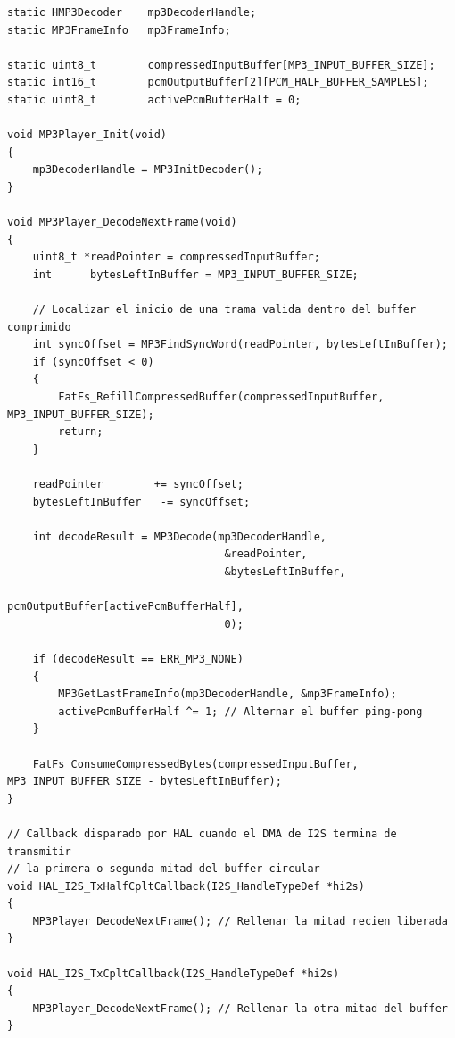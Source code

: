 \documentclass[pdflatex,sn-mathphys-num]{sn-jnl}%
\begin{document}
\begin{lstlisting}[style=algorithmstyle]
static HMP3Decoder    mp3DecoderHandle;
static MP3FrameInfo   mp3FrameInfo;

static uint8_t        compressedInputBuffer[MP3_INPUT_BUFFER_SIZE];
static int16_t        pcmOutputBuffer[2][PCM_HALF_BUFFER_SAMPLES];
static uint8_t        activePcmBufferHalf = 0;

void MP3Player_Init(void)
{
    mp3DecoderHandle = MP3InitDecoder();
}

void MP3Player_DecodeNextFrame(void)
{
    uint8_t *readPointer = compressedInputBuffer;
    int      bytesLeftInBuffer = MP3_INPUT_BUFFER_SIZE;

    // Localizar el inicio de una trama valida dentro del buffer comprimido
    int syncOffset = MP3FindSyncWord(readPointer, bytesLeftInBuffer);
    if (syncOffset < 0)
    {
        FatFs_RefillCompressedBuffer(compressedInputBuffer, MP3_INPUT_BUFFER_SIZE);
        return;
    }

    readPointer        += syncOffset;
    bytesLeftInBuffer   -= syncOffset;

    int decodeResult = MP3Decode(mp3DecoderHandle,
                                  &readPointer,
                                  &bytesLeftInBuffer,
                                  pcmOutputBuffer[activePcmBufferHalf],
                                  0);

    if (decodeResult == ERR_MP3_NONE)
    {
        MP3GetLastFrameInfo(mp3DecoderHandle, &mp3FrameInfo);
        activePcmBufferHalf ^= 1; // Alternar el buffer ping-pong
    }

    FatFs_ConsumeCompressedBytes(compressedInputBuffer, MP3_INPUT_BUFFER_SIZE - bytesLeftInBuffer);
}

// Callback disparado por HAL cuando el DMA de I2S termina de transmitir
// la primera o segunda mitad del buffer circular
void HAL_I2S_TxHalfCpltCallback(I2S_HandleTypeDef *hi2s)
{
    MP3Player_DecodeNextFrame(); // Rellenar la mitad recien liberada
}

void HAL_I2S_TxCpltCallback(I2S_HandleTypeDef *hi2s)
{
    MP3Player_DecodeNextFrame(); // Rellenar la otra mitad del buffer
}
\end{lstlisting}
\end{document}
